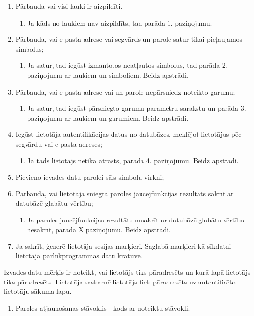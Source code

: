 {
	\begin{enumerate}
		\item Pārbauda vai visi lauki ir aizpildīti.
		      \begin{enumerate}
			      \item Ja kāds no laukiem nav aizpildīts, tad parāda 1. paziņojumu.
		      \end{enumerate}
		\item Pārbauda, vai e-pasta adrese vai segvārds un parole satur tikai pieļaujamos simbolus;
		      \begin{enumerate}
			      \item Ja satur, tad iegūst izmantotos neatļautos simbolus, tad parāda 2. paziņojumu ar laukiem un simboliem. Beidz apstrādi.
		      \end{enumerate}
		\item Pārbauda, vai e-pasta adrese vai un parole nepārsniedz noteikto garumu;
		      \begin{enumerate}
			      \item Ja satur, tad iegūst pārsniegto garumu parametru sarakstu un parāda 3. paziņojumu ar laukiem un garumiem. Beidz apstrādi.
		      \end{enumerate}
		\item Iegūst lietotāja autentifikācijas datus no datubāzes, meklējot lietotājus pēc segvārdu vai e-pasta adreses;
		      \begin{enumerate}
			      \item Ja tāds lietotājs netika atrasts, parāda 4. paziņojumu. Beidz apstrādi.
		      \end{enumerate}
		\item Pievieno ievades datu parolei sāls simbolu virkni;
		\item Pārbauda, vai lietotāja sniegtā paroles jaucējfunkcijas rezultāts sakrīt ar datubāzē glabātu vērtību;
		      \begin{enumerate}
			      \item Ja paroles jaucējfunkcijas rezultāts nesakrīt ar datubāzē glabāto vērtību nesakrīt, parāda X paziņojumu. Beidz apstrādi.
		      \end{enumerate}
		\item Ja sakrīt, ģenerē lietotāja sesijas marķieri. Saglabā marķieri kā sīkdatni lietotāja pārlūkprogrammas datu krātuvē.
	\end{enumerate}
}
{
	Izvades datu mērķis ir noteikt, vai lietotājs tiks pāradresēts un kurā lapā lietotājs tiks pāradresēts.
	Lietotāja saskarnē lietotājs tiek pāradresēts uz autentificēto lietotāju sākuma lapu.
	\begin{enumerate}
		\item Paroles atjaunošanas stāvoklis - kods ar noteiktu stāvokli.
	\end{enumerate}
}
